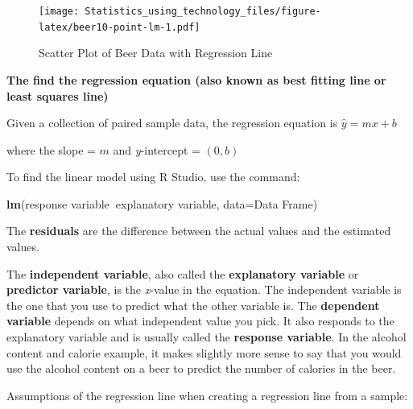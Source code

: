 \documentclass[
]{book}
\newenvironment{Shaded}{\begin{snugshade}}{\end{snugshade}}
\newcommand{\DataTypeTok}[1]{\textcolor[rgb]{0.13,0.29,0.53}{#1}}
\newcommand{\KeywordTok}[1]{\textcolor[rgb]{0.13,0.29,0.53}{\textbf{#1}}}
\newcommand{\NormalTok}[1]{#1}
\newcommand{\OperatorTok}[1]{\textcolor[rgb]{0.81,0.36,0.00}{\textbf{#1}}}
\newcommand{\StringTok}[1]{\textcolor[rgb]{0.31,0.60,0.02}{#1}}
\begin{document}
\begin{Shaded}
\end{Shaded}

\begin{figure}
\centering
\texttt{[image: Statistics\_using\_technology\_files/figure-latex/beer10-point-lm-1.pdf]}
\caption{\label{fig:beer10-point-lm}Scatter Plot of Beer Data with Regression Line}
\end{figure}

\textbf{The find the regression equation (also known as best fitting line or least squares line)}

Given a collection of paired sample data, the regression equation is \(\hat{y}=mx+b\)

where the slope = \(m\) and \emph{y}-intercept = \((0,b)\)

To find the linear model using R Studio, use the command:

\begin{Shaded}
\begin{Highlighting}[]
\KeywordTok{lm}\NormalTok{(response variable}\OperatorTok{~}\NormalTok{explanatory variable, }\DataTypeTok{data=}\NormalTok{Data Frame)}
\end{Highlighting}
\end{Shaded}

The \textbf{residuals} are the difference between the actual values and the estimated values.

The \textbf{independent variable}, also called the \textbf{explanatory variable} or \textbf{predictor variable}, is the \emph{x}-value in the equation. The independent variable is the one that you use to predict what the other variable is. The \textbf{dependent variable} depends on what independent value you pick. It also responds to the explanatory variable and is usually called the \textbf{response variable}. In the alcohol content and calorie example, it makes slightly more sense to say that you would use the alcohol content on a beer to predict the number of calories in the beer.

Assumptions of the regression line when creating a regression line from a sample:
\end{document}
